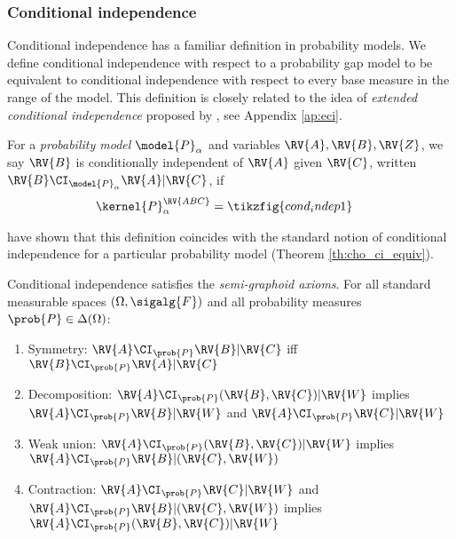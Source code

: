 \subsubsection{Conditional independence}\label{ssec:cond_indep}

Conditional independence has a familiar definition in probability models. We define conditional independence with respect to a probability gap model to be equivalent to conditional independence with respect to every base measure in the range of the model. This definition is closely related to the idea of \emph{extended conditional independence} proposed by \citet{constantinou_extended_2017}, see Appendix \ref{ap:eci}.

\begin{definition}
For a \emph{probability model} $\model{P}_{\alpha}$ and variables $\RV{A},\RV{B},\RV{Z}$, we say $\RV{B}$ is conditionally independent of $\RV{A}$ given $\RV{C}$, written $\RV{B}\CI_{\model{P}_{\alpha}}\RV{A}|\RV{C}$, if
\begin{align}
    \kernel{P}_{\alpha}^{\RV{ABC}} &= \tikzfig{cond_indep1} \label{eq:cond_indep}
\end{align}
\end{definition}

\citet{cho_disintegration_2019} have shown that this definition coincides with the standard notion of conditional independence for a particular probability model (Theorem \ref{th:cho_ci_equiv}). 

Conditional independence satisfies the \emph{semi-graphoid axioms}. For all standard measurable spaces $(\Omega,\sigalg{F})$ and all probability measures $\prob{P}\in \Delta(\Omega)$:

\begin{enumerate}
    \item Symmetry: $\RV{A}\CI_{\prob{P}} \RV{B}|\RV{C}$ iff $\RV{B}\CI_{\prob{P}} \RV{A}|\RV{C}$
    \item Decomposition: $\RV{A}\CI_{\prob{P}} (\RV{B},\RV{C})|\RV{W}$ implies $\RV{A}\CI_{\prob{P}}\RV{B}|\RV{W}$ and $\RV{A}\CI_{\prob{P}}\RV{C}|\RV{W}$
    \item Weak union: $\RV{A}\CI_{\prob{P}}(\RV{B},\RV{C})|\RV{W}$ implies $\RV{A}\CI_{\prob{P}}\RV{B}|(\RV{C},\RV{W})$
    \item Contraction: $\RV{A}\CI_{\prob{P}}\RV{C}|\RV{W}$ and $\RV{A}\CI_{\prob{P}}\RV{B}|(\RV{C},\RV{W})$ implies $\RV{A}\CI_{\prob{P}}(\RV{B},\RV{C})|\RV{W}$
\end{enumerate}

